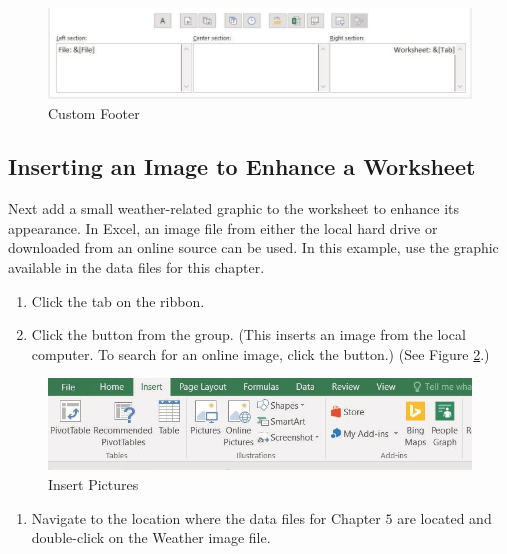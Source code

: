 \begin{figure}[H]
	\centering
	\includegraphics[width=\maxwidth{.95\linewidth}]{gfx/ch05_fig27}
	\caption{Custom Footer}
	\label{05:fig27}
\end{figure}

\subsection{Inserting an Image to Enhance a Worksheet}

Next add a small weather-related graphic to the worksheet to enhance its appearance. In Excel, an image file from either the local hard drive or downloaded from an online source can be used. In this example, use the graphic available in the data files for this chapter.

\begin{enumerate}
	\item Click the  tab on the ribbon.
	\item Click the  button from the  group. (This inserts an image from the local computer. To search for an online image, click the  button.) (See Figure \ref{05:fig28}.)
\end{enumerate}

\begin{figure}[H]
	\centering
	\includegraphics[width=\maxwidth{.95\linewidth}]{gfx/ch05_fig28}
	\caption{Insert Pictures}
	\label{05:fig28}
\end{figure}

\begin{enumerate}[resume]
	\item Navigate to the location where the data files for Chapter $ 5 $ are located and double-click on the Weather image file.
\end{enumerate}

